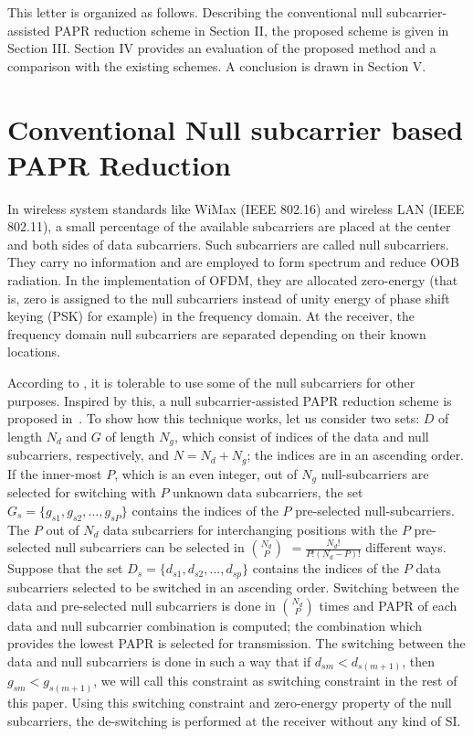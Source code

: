 \documentclass[journal,comsoc]{IEEEtran}
\begin{document}
This letter is organized as follows. Describing the conventional null subcarrier-assisted PAPR reduction scheme in Section II, the proposed scheme is given in Section III. Section IV provides an evaluation of the proposed method and a comparison with the existing schemes. A conclusion is drawn in Section V. 

\section{Conventional Null subcarrier based PAPR Reduction}


In wireless system standards like WiMax (IEEE 802.16) and wireless LAN (IEEE 802.11), a small percentage of the available subcarriers are placed at the center and both sides of data subcarriers. Such subcarriers are called null subcarriers. They carry no information and are employed to form spectrum and reduce OOB radiation. In the implementation of OFDM, they are allocated zero-energy (that is, zero is assigned to the null subcarriers instead of unity energy of phase shift keying (PSK) for example) in the frequency domain. At the receiver, the frequency domain null subcarriers are separated depending on their known locations. 

According to \cite{IEEEhowto:Li}, it is tolerable to use some of the null subcarriers for other purposes. Inspired by this, a null subcarrier-assisted PAPR reduction scheme is proposed in~\cite{IEEEhowto:wong1}. To show how this technique works, let us consider two sets: $D$ of length $N_d$ and $G$ of length $N_g$, which consist of indices of the data and null subcarriers, respectively, and $N=N_d+N_g$; the indices are in an ascending order. If the inner-most $P$, which is an even integer, out of $N_g$ null-subcarriers are selected for switching with $P$ unknown data subcarriers, the set $G_s=\{g_{s1},g_{s2},...,g_{sP}\}$   contains the indices of the $P$ pre-selected null-subcarriers. The $P$ out of $N_d$ data subcarriers for interchanging positions with the $P$ pre-selected null subcarriers can be selected in $N_d \choose P$ $=\frac{N_d!}{P!(N_d-P)!}$ different ways. Suppose that the set $D_s=\{d_{s1},d_{s2},...,d_{sp}\}$    contains the indices of the $P$ data subcarriers selected to be switched in an ascending order. Switching between the data and pre-selected null subcarriers is done in $N_d \choose P$ times and PAPR of each data and null subcarrier combination is computed; the combination which provides the lowest PAPR is selected for transmission.  The switching between the data and null subcarriers is done in such a way that if    $d_{sm}<d_{s(m+1)}$, then $g_{sm}<g_{s(m+1)}$, we will call this constraint as switching constraint in the rest of this paper. Using this switching constraint and zero-energy property of the null subcarriers, the de-switching is performed at the receiver without any kind of SI. 
\end{document}
